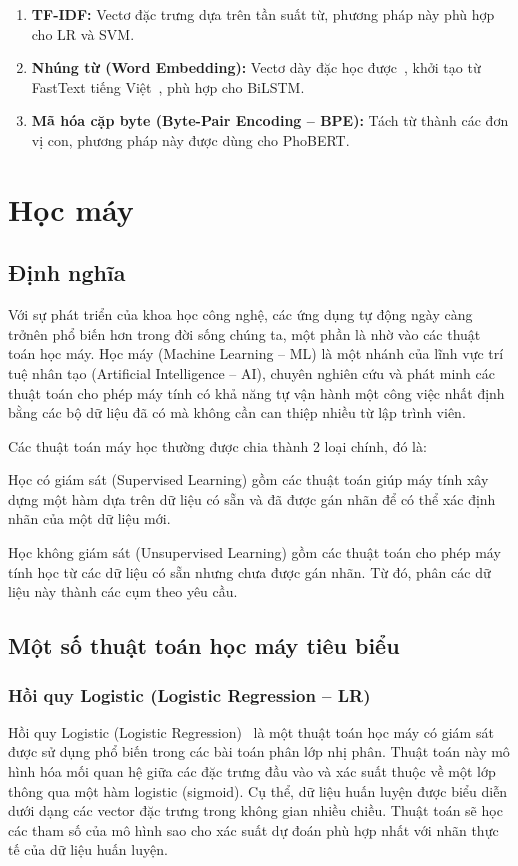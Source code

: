 \documentclass[12pt, a4paper]{report}
\begin{document}
\begin{enumerate}[leftmargin=2.5em]
  \item \textbf{TF-IDF:} Vectơ đặc trưng dựa trên tần suất từ, phương pháp này phù hợp cho LR và SVM.
  \item \textbf{Nhúng từ (Word Embedding):} Vectơ dày đặc học được~\cite{mikolov2013word2vec}, khởi tạo từ FastText tiếng Việt~\cite{bojanowski2017fasttext}, phù hợp cho BiLSTM.
  \item \textbf{Mã hóa cặp byte (Byte-Pair Encoding -- BPE):} Tách từ thành các đơn vị con, phương pháp này được dùng cho PhoBERT.
\end{enumerate}

\section{Học máy}

\subsection{Định nghĩa}

Với sự phát triển của khoa học công nghệ, các ứng dụng tự động ngày càng trởnên phổ biến hơn trong đời sống chúng ta, một phần là nhờ vào các thuật toán học máy. Học máy (Machine Learning – ML) là một nhánh của lĩnh vực trí tuệ nhân tạo (Artificial Intelligence – AI), chuyên nghiên cứu và phát minh các thuật toán cho phép máy tính có khả năng tự vận hành một công việc nhất định bằng các bộ dữ liệu đã có
mà không cần can thiệp nhiều từ lập trình viên.

Các thuật toán máy học thường được chia thành 2 loại chính, đó là:

Học có giám sát (Supervised Learning) gồm các thuật toán giúp máy tính xây dựng một hàm dựa trên dữ liệu có sẵn và đã được gán nhãn để có thể xác định nhãn của một dữ liệu mới.

Học không giám sát (Unsupervised Learning) gồm các thuật toán cho phép máy tính học từ các dữ liệu có sẵn nhưng chưa được gán nhãn. Từ đó, phân các dữ liệu này thành các cụm theo yêu cầu.

\subsection{Một số thuật toán học máy tiêu biểu}
\subsubsection{Hồi quy Logistic (Logistic Regression -- LR)}
Hồi quy Logistic (Logistic Regression)~\cite{cox1958regression} là một thuật toán học máy có giám sát được sử dụng phổ biến trong các bài toán phân lớp nhị phân. Thuật toán này mô hình hóa mối quan hệ giữa các đặc trưng đầu vào và xác suất thuộc về một lớp thông qua một hàm logistic (sigmoid). Cụ thể, dữ liệu huấn luyện được biểu diễn dưới dạng các vector đặc trưng trong không gian nhiều chiều. Thuật toán sẽ học các tham số của mô hình sao cho xác suất dự đoán phù hợp nhất với nhãn thực tế của dữ liệu huấn luyện.
\end{document}
